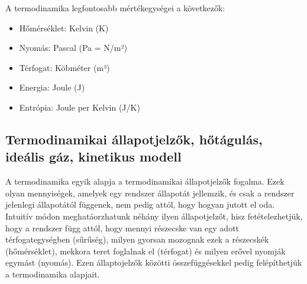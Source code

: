 \documentclass[../main.tex]{subfiles}
\begin{document}
A termodinamika legfontosabb mértékegységei a következők:
\begin{itemize}
    \item Hőmérséklet: Kelvin (K)
    \item Nyomás: Pascal (Pa = N/m²)
    \item Térfogat: Köbméter (m³)
    \item Energia: Joule (J)
    \item Entrópia: Joule per Kelvin (J/K)
\end{itemize}

\subsection{Termodinamikai állapotjelzők, hőtágulás, ideális gáz, kinetikus modell}
A termodinamika egyik alapja a termodinamikai állapotjelzők fogalma. Ezek olyan mennyiségek, amelyek egy rendszer állapotát jellemzik, és csak a rendszer jelenlegi állapotától függenek,
nem pedig attól, hogy hogyan jutott el oda. Intuitív módon meghatáorzhatunk néhány ilyen állapotjelzőt, hisz fetételezhetjük, hogy a rendszer függ attól, hogy mennyi 
részecske van egy adott térfogategységben (sűrűség), milyen gyorsan mozognak ezek a részecskék (hőmérséklet), mekkora teret foglalnak el (térfogat) és milyen erővel nyomják egymást (nyomás).
Ezen állaptojelzők közötti összefüggésekkel pedig felépíthetjük a termodinamika alapjait. 
\end{document}
